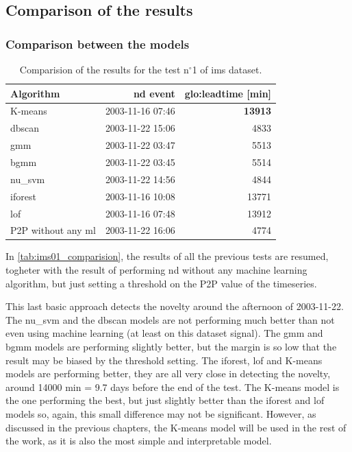 \subsection{Comparison of the results}

\subsubsection{Comparison between the models}

\begin{table}
    \centering
    \caption{Comparision of the results for the test $\text{n}^\circ$1 of \gls{ims} dataset.}
    \label{tab:ims01_comparision}
    \begin{tabular}{lrr} 
    \toprule
    \textbf{Algorithm} & \textbf{\gls{nd} event} & \textbf{\gls{glo:leadtime} }{[}min] \\ 
    \hline
    K-means & 2003-11-16 07:46 & \textbf{13913} \\
    \gls{dbscan} & 2003-11-22 15:06 & 4833 \\
    \gls{gmm} & 2003-11-22 03:47 & 5513 \\
    \gls{bgmm} & 2003-11-22 03:45 & 5514 \\
    \gls{nu_svm} & 2003-11-22 14:56 & 4844 \\
    \gls{iforest} & 2003-11-16 10:08 & 13771 \\
    \gls{lof} & 2003-11-16 07:48 & 13912 \\
    {P2P} without any \gls{ml} & 2003-11-22 16:06 & 4774 \\
    \bottomrule
    \end{tabular}
\end{table}

In \autoref{tab:ims01_comparision}, the results of all the previous tests are resumed, togheter with the result of performing \gls{nd} without any machine learning algorithm, but just setting a threshold on the P2P value of the timeseries.

This last basic approach detects the novelty around the afternoon of 2003-11-22. The \gls{nu_svm} and the \gls{dbscan} models are not performing much better than not even using machine learning (at least on this dataset signal). The \gls{gmm} and \gls{bgmm} models are performing slightly better, but the margin is so low that the result may be biased by the threshold setting. The \gls{iforest}, \gls{lof} and K-means models are performing better, they are all very close in detecting the novelty, around 14000 min = 9.7 days before the end of the test. The K-means model is the one performing the best, but just slightly better than the \gls{iforest} and \gls{lof} models so, again, this small difference may not be significant. However, as discussed in the previous chapters, the K-means model will be used in the rest of the work, as it is also the most simple and interpretable model.


